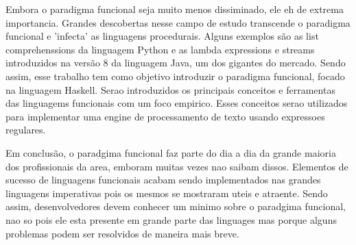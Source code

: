 Embora o paradigma funcional seja muito menos dissiminado, ele eh de extrema importancia.
Grandes descobertas nesse campo de estudo transcende o paradigma funcional e 'infecta' as linguagens procedurais.
Alguns exemplos são as list comprehenssions da linguagem Python e as lambda expressions e streams introduzidos na versão 8 da linguagem Java, um dos gigantes do mercado.
Sendo assim, esse trabalho tem como objetivo introduzir o paradigma funcional, focado na linguagem Haskell.
Serao introduzidos os principais conceitos e ferramentas das linguagems funcionais com um foco empirico.
Esses conceitos serao utilizados para implementar uma engine de processamento de texto usando expressoes regulares.

Em conclusão, o paradgima funcional faz parte do dia a dia da grande maioria dos profissionais da area, emboram muitas vezes nao saibam dissos.
Elementos de sucesso de linguagens funcionais acabam sendo implementados nas grandes linguagens imperativas pois os mesmos se mostraram uteis e atraente.
Sendo assim, desenvolvedores devem conhecer um minimo sobre o paradgima funcional, nao so pois ele esta presente em grande parte das linguages mas porque alguns problemas podem ser resolvidos de maneira mais breve.
